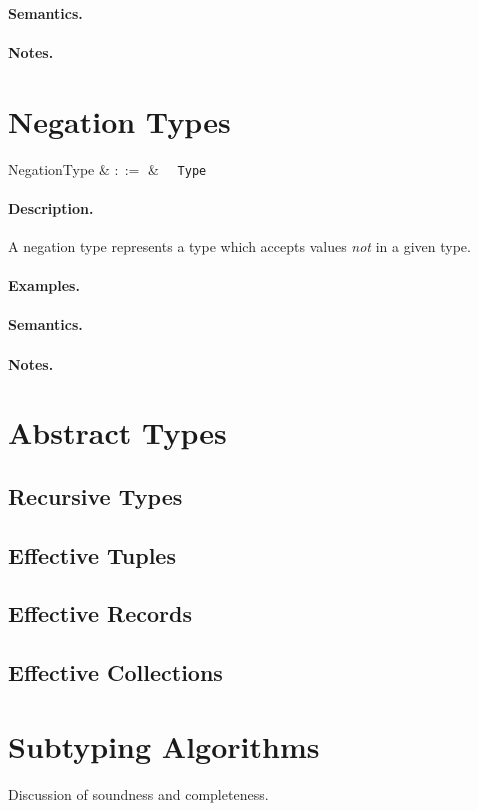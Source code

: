 \paragraph{Semantics.}

\paragraph{Notes.}


\section{Negation Types}

\begin{syntax}
  NegationType & $::=$ & \token{!}\ \ \verb+Type+\\
\end{syntax}

\paragraph{Description.}  A negation type represents a type which
accepts values {\em not} in a given type.

\paragraph{Examples.}

\paragraph{Semantics.}

\paragraph{Notes.}

\section{Abstract Types}
\subsection{Recursive Types}
\subsection{Effective Tuples}
\subsection{Effective Records}
\subsection{Effective Collections}

\section{Subtyping Algorithms}
Discussion of soundness and completeness.
